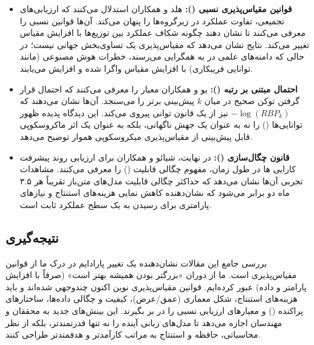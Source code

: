 \begin{itemize}
    \item \textbf{قوانین مقیاس‌پذیری نسبی ():} هلد و همکاران \cite{held2026relative} استدلال می‌کنند که ارزیابی‌های تجمیعی، تفاوت عملکرد در زیرگروه‌ها را پنهان می‌کند. آن‌ها قوانین نسبی را معرفی می‌کنند تا نشان دهند چگونه شکاف عملکرد بین توزیع‌ها با افزایش مقیاس تغییر می‌کند. نتایج نشان می‌دهد که مقیاس‌پذیری یک تساوی‌بخش جهانی نیست؛ در حالی که دامنه‌های علمی در  به همگرایی می‌رسند، خطرات هوش مصنوعی (مانند توانایی فریبکاری) با افزایش مقیاس واگرا شده و افزایش می‌یابند.
    
    \item \textbf{احتمال مبتنی بر رتبه ():} یو و همکاران \cite{yue2025relative} معیار  را معرفی می‌کنند که احتمال قرار گرفتن توکن صحیح در میان $k$ پیش‌بینی برتر را می‌سنجد. آن‌ها نشان می‌دهند که $-\log(RBP_k)$ نیز از یک قانون توانی پیروی می‌کند. این دیدگاه پدیده ظهور توانایی‌ها () را نه به عنوان یک جهش ناگهانی، بلکه به عنوان یک اثر ماکروسکوپی قابل پیش‌بینی از مقیاس‌پذیری میکروسکوپی هموار توضیح می‌دهد.
    
    \item \textbf{قانون چگال‌سازی ():} در نهایت، شیائو و همکاران \cite{xiao2025densing} برای ارزیابی روند پیشرفت کارایی ها در طول زمان، مفهوم چگالی قابلیت () را معرفی می‌کنند. مشاهدات تجربی آن‌ها نشان می‌دهد که حداکثر چگالی قابلیت مدل‌های متن‌باز تقریباً هر ۳.۵ ماه دو برابر می‌شود که نشان‌دهنده کاهش نمایی هزینه‌های استنتاج و نیازهای پارامتری برای رسیدن به یک سطح عملکرد ثابت است.
\end{itemize}

\subsection{نتیجه‌گیری}
بررسی جامع این مقالات نشان‌دهنده یک تغییر پارادایم در درک ما از قوانین مقیاس‌پذیری است. ما از دوران «بزرگتر بودن همیشه بهتر است» (صرفاً با افزایش پارامتر و داده) عبور کرده‌ایم. قوانین مقیاس‌پذیری نوین اکنون چندوجهی شده‌اند و باید هزینه‌های استنتاج، شکل معماری (عمق/عرض)، کیفیت و چگالی داده‌ها، ساختارهای پراکنده () و معیارهای ارزیابی نسبی را در بر بگیرند. این بینش‌های جدید به محققان و مهندسان اجازه می‌دهد تا مدل‌های زبانی آینده را نه تنها قدرتمندتر، بلکه از نظر محاسباتی، حافظه و استنتاج به مراتب کارآمدتر و هدفمندتر طراحی کنند.